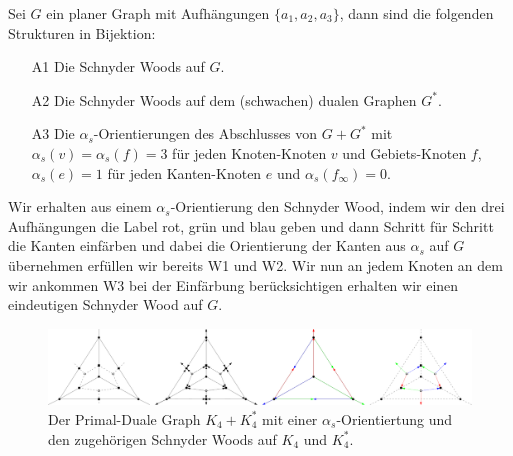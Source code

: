 \begin{theorem}\label{alpha_bij}
Sei $G$ ein planer Graph mit Aufhängungen $\{a_1,a_2,a_3\}$, dann sind die folgenden Strukturen in Bijektion:
\begin{itemize}
\item [A1] Die Schnyder Woods auf $G$.
\item [A2] Die Schnyder Woods auf dem (schwachen) dualen Graphen $G^*$.
\item [A3] Die $\alpha_{s}$-Orientierungen des Abschlusses von $G+G^*$ mit $\alpha_s(v) = \alpha_s(f) = 3$ für jeden Knoten-Knoten $v$ und Gebiets-Knoten $f$,  $\alpha_s(e) = 1$ für jeden Kanten-Knoten $e$ und  $\alpha_s(f_\infty) = 0$.
\end{itemize}
\end{theorem}

\begin{remark}
Wir erhalten aus einem $\alpha_s$-Orientierung den Schnyder Wood, indem wir den drei Aufhängungen die Label rot, grün und blau geben und dann Schritt für Schritt die Kanten einfärben und dabei die Orientierung der Kanten aus $\alpha_s$ auf $G$ übernehmen erfüllen wir bereits W1 und W2. Wir nun an jedem Knoten an dem wir ankommen W3 bei der Einfärbung berücksichtigen erhalten wir einen eindeutigen Schnyder Wood auf $G$.
\end{remark}

\begin{figure}
	\centering
	\includegraphics[width=1\textwidth]{alpha_ex2.png}
  \caption{Der Primal-Duale Graph $K_4+K_4^*$ mit einer $\alpha_s$-Orientiertung und den zugehörigen Schnyder Woods auf $K_4$ und $K^*_4$. }
\end{figure}